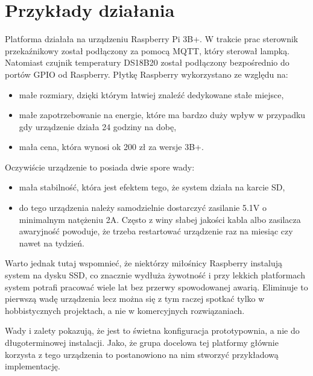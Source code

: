 \chapter{Przykłady działania}
Platforma działała na urządzeniu Raspberry Pi 3B+.
W trakcie prac sterownik przekaźnikowy został podłączony za pomocą MQTT, który sterował lampką. Natomiast czujnik temperatury DS18B20 został podłączony bezpośrednio do portów GPIO od Raspberry. Płytkę Raspberry wykorzystano ze względu na: 
\begin{itemize}
    \item małe rozmiary, dzięki którym łatwiej znaleźć dedykowane stałe miejsce,
    \item małe zapotrzebowanie na energie, które ma bardzo duży wpływ w przypadku gdy urządzenie działa 24 godziny na dobę,
    \item mała cena, która wynosi ok 200 zł za wersje 3B+.
\end{itemize}
Oczywiście urządzenie to posiada dwie spore wady:
\begin{itemize}
    \item mała stabilność, która jest efektem tego, że system działa na karcie SD,
    \item do tego urządzenia należy samodzielnie dostarczyć zasilanie 5.1V o minimalnym natężeniu 2A. Często z winy słabej jakości kabla albo zasilacza awaryjność powoduje, że trzeba restartować urządzenie raz na miesiąc czy nawet na tydzień.
\end{itemize}
Warto jednak tutaj wspomnieć, że niektórzy miłośnicy Raspberry instalują system na dysku SSD, co znacznie wydłuża żywotność i przy lekkich platformach system potrafi pracować wiele lat bez przerwy spowodowanej awarią. Eliminuje to pierwszą wadę urządzenia lecz można się z tym raczej spotkać tylko w hobbistycznych projektach, a nie w komercyjnych rozwiązaniach.
\par
Wady i zalety pokazują, że jest to świetna konfiguracja prototypownia, a nie do długoterminowej instalacji. Jako, że grupa docelowa tej platformy głównie korzysta z tego urządzenia to postanowiono na nim stworzyć przykładową implementację.
\newpage
